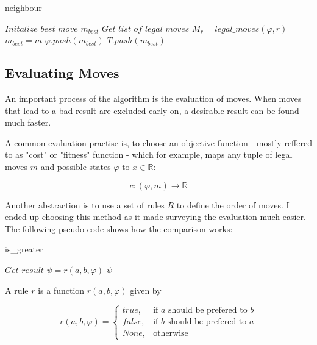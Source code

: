 \documentclass[a4paper,10pt,parskip]{article}
\begin{document}
\begin{algorithm}
\caption{neighbour}\label{alg:neighbour}
\begin{algorithmic}
        \State $\textit{Initalize best move } m_{best}$
        \State $\textit{Get list of legal moves } M_r = legal\_moves(\varphi, r)$
                \State $m_{best} = m$
            \EndIf
        \EndFor
            \State $\varphi.push(m_{best})$
            \State $T.push(m_{best})$
        \EndIf
    \EndFor
    \Return {$\varphi$}
\end{algorithmic}
\end{algorithm}

\subsection{Evaluating Moves}

An important process of the algorithm is the evaluation of moves. When moves that 
lead to a bad result are excluded early on, a desirable result can be found much 
faster. 

A common evaluation practise is, to choose an objective function - mostly reffered 
to as "cost" or "fitness" function - which for example, maps any tuple of legal 
moves $m$ and possible states $\varphi$ to $x \in \mathbb{R}$:

$$
c : (\varphi, m) \rightarrow \mathbb{R}
$$
 
Another abstraction is to use a set of rules $R$ to define the order of moves. 
I ended up choosing this method as it made surveying the evaluation much easier. 
The following pseudo code shows how the comparison works:

\begin{algorithm}
\caption{is\_greater}\label{is-greater}
\begin{algorithmic}
        \State $\textit{Get result } \psi = r(a, b, \varphi)$
            \Return $\psi$
        \EndIf
    \EndFor
\end{algorithmic}
\end{algorithm}

A rule $r$ is a function $r(a, b, \varphi)$ given by

\[
    r(a, b, \varphi) = 
    \begin{cases}
        true,& \text{if } a \text{ should be prefered to } b\\
        false,& \text{if } b \text{ should be prefered to } a\\
        None,& \text{otherwise}
    \end{cases}
\]
\end{document}
